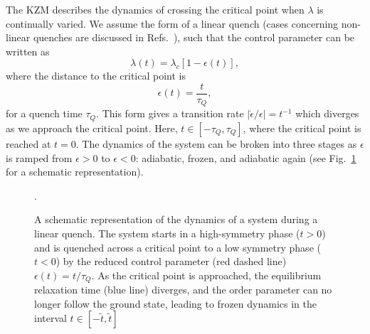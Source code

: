 The KZM describes the dynamics of crossing the critical point when \( \lambda \)
is continually varied.
We assume the form of a linear quench (cases concerning non-linear quenches are
discussed in Refs.~\cite{Barankov2008,Mondal2009}), such that the control
parameter can be written as
\begin{equation}
    \lambda(t) = \lambda_c\left[1 - \epsilon(t)\right],
\end{equation}
where the distance to the critical point is
\begin{equation}
    \epsilon(t) = \frac{t}{\tau_Q},
    \label{eq: time-dependent-epsilon}
\end{equation}
for a quench time \( \tau_Q \).
This form gives a transition rate \( |\dot{\epsilon}/{\epsilon}|=t^{-1} \) which
diverges as we approach the critical point.
Here, \( t \in [-\tau_Q, \tau_Q] \), where the critical point is reached at
\( t=0 \).
The dynamics of the system can be broken into three stages as \( \epsilon \) is
ramped from \( \epsilon > 0 \) to \( \epsilon < 0 \): adiabatic, frozen, and
adiabatic again (see Fig.~\ref{fig: adiabatic-impulse} for a schematic
representation).
\begin{figure}
    \centering
    \caption[Schematic representation of the dynamics of a system during a
        linear quench]
    {A schematic representation of the dynamics of a system during a
    linear quench. The system starts in a high-symmetry phase (\( t > 0 \)) and
    is quenched across a critical point to a low symmetry phase (\( t < 0 \)) by
    the reduced control parameter (red dashed line) \( \epsilon(t) = t/\tau_Q\).
    As the critical point is approached, the equilibrium relaxation time
    (blue line) diverges, and the order parameter can no longer follow the
    ground state, leading to frozen dynamics in the interval
    \( t \in [-\tilde{t}, \tilde{t}] \)}.\label{fig: adiabatic-impulse}
\end{figure}

